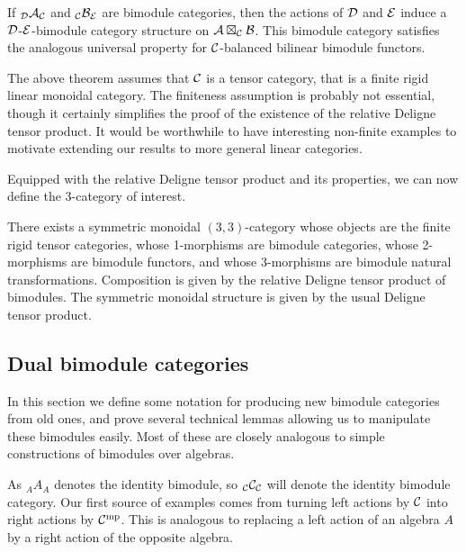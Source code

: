\documentclass{amsart}
\begin{document}
\begin{remark}
	If ${}_{\mathcal D}\mathcal A_{\mathcal C}$ and ${}_{\mathcal C}\mathcal B_{\mathcal E}$ are bimodule categories, then the actions of $\mathcal D$ and $\mathcal E$ induce a $\mathcal D$-$\mathcal E$-bimodule category structure on $\mathcal A \boxtimes_{\mathcal C} \mathcal B$. This bimodule category satisfies the analogous universal property for $\mathcal C$-balanced bilinear bimodule functors. 
\end{remark}

\begin{remark}
The above theorem assumes that $\mathcal C$ is a tensor category, that is a finite rigid linear monoidal category.  The finiteness assumption is probably not essential, though it certainly simplifies the proof of the existence of the relative Deligne tensor product.  It would be worthwhile to have interesting non-finite examples to motivate extending our results to more general linear categories.
\end{remark}



Equipped with the relative Deligne tensor product and its properties, we can now define the 3-category of interest.

\begin{maintheorem}[\cite{3TC}]
	There exists a symmetric monoidal $(3,3)$-category whose objects are the finite rigid tensor categories, whose 1-morphisms are bimodule categories, whose 2-morphisms are bimodule functors, and whose 3-morphisms are bimodule natural transformations. Composition is given by the relative Deligne tensor product of bimodules. The symmetric monoidal structure is given by the usual Deligne tensor product. 
\end{maintheorem}


\subsection{Dual bimodule categories} \label{sec:examples_of_bimods}

In this section we define some notation for producing new bimodule categories from old ones, and prove several technical lemmas allowing us to manipulate these bimodules easily.  Most of these are closely analogous to simple constructions of bimodules over algebras.

As ${}_A A_A$ denotes the identity bimodule, so ${}_\mathcal C \mathcal C_{\mathcal C}$ will denote the identity bimodule category.  Our first source of examples comes from turning left actions by $\mathcal C$ into right actions by $\mathcal C^{\mathrm{mp}}$.  This is analogous to replacing a left action of an algebra $A$ by a right action of the opposite algebra.
\end{document}
